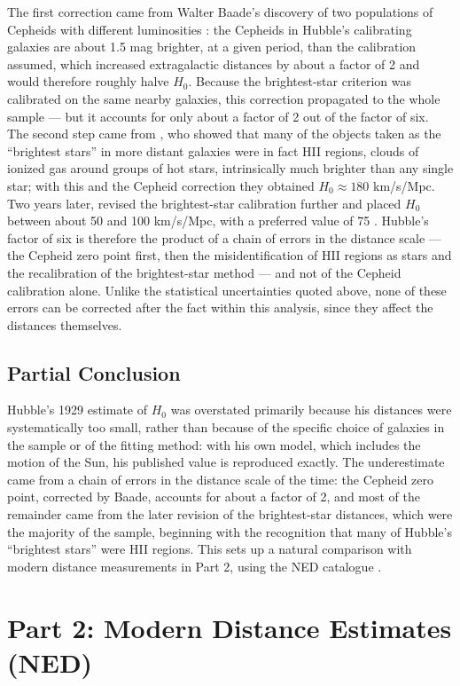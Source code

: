 \documentclass[11pt]{article}
\begin{document}
The first correction came from Walter Baade's discovery of two populations of Cepheids with different luminosities \citep{baade1956}: the Cepheids in Hubble's calibrating galaxies are about 1.5 mag brighter, at a given period, than the calibration assumed, which increased extragalactic distances by about a factor of 2 \citep{tully2023} and would therefore roughly halve $H_0$. Because the brightest-star criterion was calibrated on the same nearby galaxies, this correction propagated to the whole sample --- but it accounts for only about a factor of 2 out of the factor of six. The second step came from \citet{humason1956}, who showed that many of the objects taken as the ``brightest stars'' in more distant galaxies were in fact HII regions, clouds of ionized gas around groups of hot stars, intrinsically much brighter than any single star; with this and the Cepheid correction they obtained $H_0 \approx 180$ km/s/Mpc. Two years later, \citet{sandage1958} revised the brightest-star calibration further and placed $H_0$ between about 50 and 100 km/s/Mpc, with a preferred value of 75 \citep{tully2023}. Hubble's factor of six is therefore the product of a chain of errors in the distance scale --- the Cepheid zero point first, then the misidentification of HII regions as stars and the recalibration of the brightest-star method --- and not of the Cepheid calibration alone. Unlike the statistical uncertainties quoted above, none of these errors can be corrected after the fact within this analysis, since they affect the distances themselves.
\subsection{Partial Conclusion}
Hubble's 1929 estimate of $H_0$ was overstated primarily because his distances were systematically too small, rather than because of the specific choice of galaxies in the sample or of the fitting method: with his own model, which includes the motion of the Sun, his published value is reproduced exactly. The underestimate came from a chain of errors in the distance scale of the time: the Cepheid zero point, corrected by Baade, accounts for about a factor of 2, and most of the remainder came from the later revision of the brightest-star distances, which were the majority of the sample, beginning with the recognition that many of Hubble's ``brightest stars'' were HII regions. This sets up a natural comparison with modern distance measurements in Part 2, using the NED catalogue \citep{ned}.
\section{Part 2: Modern Distance Estimates (NED)}
\end{document}
